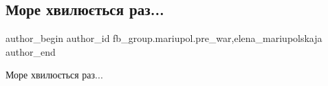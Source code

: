 
 
 
 
 

\subsection{Море хвилюється раз...}
\label{sec:11_01_2023.fb.fb_group.mariupol.pre_war.2.more_khvilyu_tsya_ra}
 
\ifcmt
 author_begin
   author_id fb_group.mariupol.pre_war,elena_mariupolskaja
 author_end
\fi

Море хвилюється раз...

